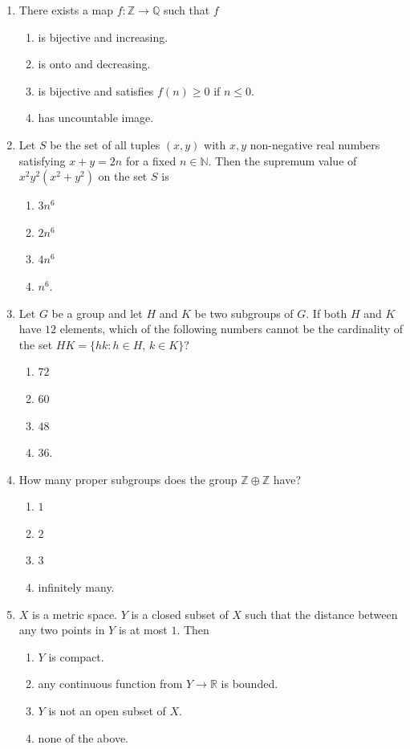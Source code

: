 \documentclass[11pt, a4paper]{article}
\begin{document}
\begin{enumerate}
  \item There exists a map $f: \mathbb{Z} \to \mathbb{Q}$ such that $f$
  \begin{enumerate}[label=\Alph*.]
    \item is bijective and increasing.
    \item is onto and decreasing.
    \item is bijective and satisfies $f(n) \ge 0$ if $n \le 0$.
    \item has uncountable image.
  \end{enumerate}

  \item Let $S$ be the set of all tuples $(x, y)$ with $x, y$ non-negative real numbers satisfying $x + y = 2n$ for a fixed $n \in \mathbb{N}$. Then the supremum value of $x^2 y^2 (x^2 + y^2)$ on the set $S$ is
  \begin{enumerate}[label=\Alph*.]
    \item $3n^6$
    \item $2n^6$
    \item $4n^6$
    \item $n^6$.
  \end{enumerate}

  \item Let $G$ be a group and let $H$ and $K$ be two subgroups of $G$. If both $H$ and $K$ have $12$ elements, which of the following numbers cannot be the cardinality of the set $HK = \{hk : h \in H, \, k \in K\}$?
  \begin{enumerate}[label=\Alph*.]
    \item $72$
    \item $60$
    \item $48$
    \item $36$.
  \end{enumerate}

  \item How many proper subgroups does the group $\mathbb{Z} \oplus \mathbb{Z}$ have?
  \begin{enumerate}[label=\Alph*.]
    \item $1$
    \item $2$
    \item $3$
    \item infinitely many.
  \end{enumerate}

  \item $X$ is a metric space. $Y$ is a closed subset of $X$ such that the distance between any two points in $Y$ is at most $1$. Then
  \begin{enumerate}[label=\Alph*.]
    \item $Y$ is compact.
    \item any continuous function from $Y \to \mathbb{R}$ is bounded.
    \item $Y$ is not an open subset of $X$.
    \item none of the above.
  \end{enumerate}


\end{enumerate}
\end{document}
